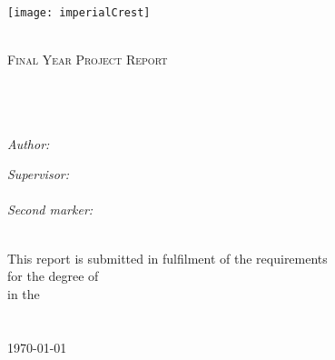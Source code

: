 \documentclass[11pt, a4paper, oneside]{Thesis} %
\begin{document}
\begin{titlepage}
\begin{center}

\texttt{[image: imperialCrest]} %

\textsc{\LARGE \univname}\\[1cm] %
\textsc{\Large Final Year Project Report}\\[0.5cm] %

\HRule \\[0.4cm] %
{\huge \bfseries \ttitle}\\[0.1cm] %
\HRule \\[1.5cm] %
 
\begin{minipage}{0.4\textwidth}
\begin{flushleft} \large
\emph{Author:}\\
{\authornames} %
\end{flushleft}
\end{minipage}
\begin{minipage}{0.4\textwidth}
\begin{flushright} \large
\emph{Supervisor:} \\
{\supname} \\%
\emph{Second marker:} \\
{\secmark}
\end{flushright}
\end{minipage}\\[2cm]
 
\large This report is submitted in fulfilment of the requirements\\ for the degree of \textit{\degreename}\\ %
in the\\
\deptname\\\univname\\[1.5cm] %

{\large \today}\\[0.1cm] %

\vfill
\end{center}

\end{titlepage}


\end{document}
